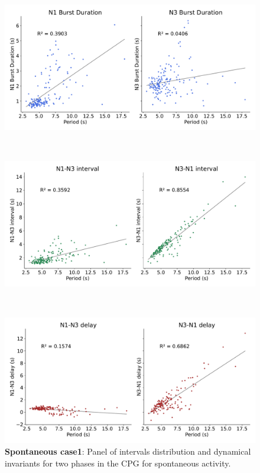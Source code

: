 \begin{figure}[htbp]
\begin{minipage}{0.9\textwidth}
\begin{minipage}[b]{0.53\textwidth}
			\centering
			\begin{minipage}[b]{\textwidth}
				\centering
				\includegraphics[width=\textwidth]{./invariants/data/SUSSEX/prep1/images/spontaneous_2phases_durations.pdf}
			\end{minipage}\\
			\begin{minipage}[b]{\textwidth}
				\centering
				\includegraphics[width=\textwidth]{./invariants/data/SUSSEX/prep1/images/spontaneous_2phases_intervals.pdf}
			\end{minipage}\\
			\begin{minipage}[b]{\textwidth}
				\centering
				\includegraphics[width=\textwidth]{./invariants/data/SUSSEX/prep1/images/spontaneous_2phases_delays.pdf}
			\end{minipage}
		\end{minipage}
	\end{minipage}
	\caption{\textbf{Spontaneous case1}: Panel of intervals distribution and dynamical invariants for two phases in the CPG for spontaneous activity.}
	\label{fig:prep1 2 phases invariants}
\end{figure}
